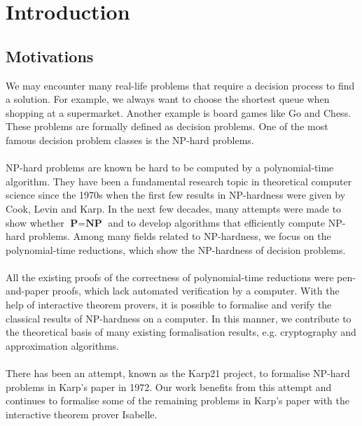\chapter{Introduction}\label{chapter:introduction}
\section{Motivations}
We may encounter many real-life problems that require a decision process to find a solution. 
For example, we always want to choose the shortest queue when shopping at a supermarket. 
Another example is board games like Go and Chess. These problems are formally defined as decision problems.
One of the most famous decision problem classes is the NP-hard problems. \\\\
NP-hard problems are known be hard to be computed by a polynomial-time algorithm. 
They have been a fundamental research topic in theoretical computer science since the 1970s
when the first few results in NP-hardness were given by Cook, Levin and Karp. 
In the next few decades, many attempts were made to show whether $\textbf{P} = \textbf{NP}$ and to develop algorithms that efficiently compute NP-hard problems. 
Among many fields related to NP-hardness, we focus on the polynomial-time reductions, which show the NP-hardness of decision problems. \\\\
All the existing proofs of the correctness of polynomial-time reductions were pen-and-paper proofs, 
which lack automated verification by a computer. 
With the help of interactive theorem provers, 
it is possible to formalise and verify the classical results of NP-hardness on a computer.
In this manner, we contribute to the theoretical basis of many existing formalisation results, 
e.g. cryptography and approximation algorithms. \\\\ 
There has been an attempt, known as the Karp21 project, to formalise NP-hard problems in Karp's paper in 1972. 
Our work benefits from this attempt and continues to formalise some of the remaining problems in Karp's paper 
with the interactive theorem prover Isabelle. 

